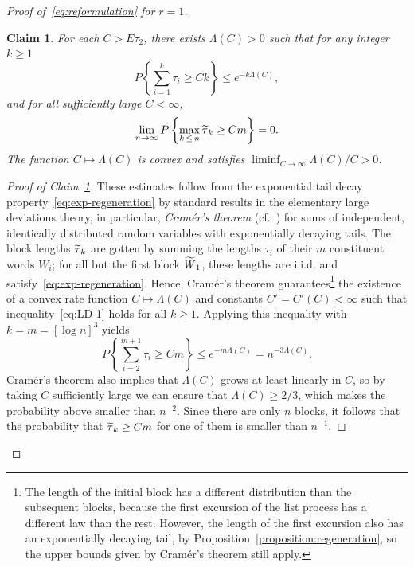 \documentclass[AHL, Unicode, longabstracts, published]{cedram}
\newtheorem{claim}{Claim}}
\let\oldtilde\tilde
\renewcommand*{\tilde}[1]{\mathchoice{\widetilde{#1}}{\widetilde{#1}}{\oldtilde{#1}}{\oldtilde{#1}}}\let\oldforall\forall
\renewcommand*{\forall}{\mathrel{\oldforall}}
\begin{document}
\begin{proof}[Proof of~\eqref{eq:reformulation} for $r= 1$]
\begin{claim}\label{claim:no-long-blocks}
For each $C>E\tau_{2}$, there exists $\Lambda (C)>0$ such that for any integer $k\geq 1$
\begin{equation}\label{eq:LD-1}
P\left\{ \sum_{i=1}^{k} \tau_{i} \geq Ck\right\}\leq e^{-k\Lambda (C)},
\end{equation}
and for all sufficiently large $C<\infty$,
\begin{equation}\label{eq:LD-2}
\lim_{n \rightarrow \infty}P\left\{\max_{k\,\leq\,n} \tilde{\tau}_{k}\geq Cm\right\}=0.
\end{equation}
The function $C\mapsto \Lambda (C)$ is convex and satisfies $\liminf_{C \rightarrow \infty}\Lambda (C)/C>0$.
\end{claim}

\begin{proof}[Proof of Claim~\ref{claim:no-long-blocks}]
These estimates follow from the exponential tail decay property~\eqref{eq:exp-regeneration} by standard results in the elementary large deviations theory, in particular, \emph{Cramér's theorem} (cf.~\cite[Section~2.2]{dembo-zeitouni}) for sums of independent, identically distributed random variables with exponentially decaying tails. The block lengths $\tilde{\tau}_{k}$ are gotten by summing the lengths $\tau_{i}$ of their $m$ constituent words $W_{i}$; for all but the first block $\tilde{W}_{1}$, these lengths are i.i.d. and satisfy~\eqref{eq:exp-regeneration}. Hence, Cramér's theorem guarantees\footnote{The length of the initial block has a different distribution than the subsequent blocks, because the first excursion of the list process has a different law than the rest. However, the length of the first excursion also has an exponentially decaying tail, by Proposition~\ref{proposition:regeneration}, so the upper bounds given by Cramér's theorem still apply.} the existence of a convex rate function $C\mapsto \Lambda (C)$ and constants $C'=C' (C) <\infty$ such that inequality~\eqref{eq:LD-1} holds for all $k\geq 1$. Applying this inequality with $k=m=[\log n]^{3}$ yields
\[
P\left\{\sum_{i=2}^{m+1} \tau_{i}\geq Cm\right\}\leq e^{-m \Lambda (C)}=n^{-3\Lambda (C)}.
\]
Cramér's theorem also implies that $\Lambda (C)$ grows at least linearly in $C$, so by taking $C$ sufficiently large we can ensure that $\Lambda (C)\geq 2/3$, which makes the probability above smaller than $n^{-2}$. Since there are only $n$ blocks, it follows that the probability that $\tilde{\tau}_{k}\geq Cm$ for one of them is smaller than $n^{-1}$.
\end{proof}


\end{proof}
\end{document}
